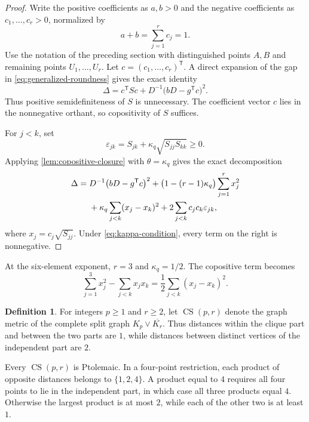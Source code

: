 \documentclass[11pt]{amsart}
\theoremstyle{definition}
\newtheorem{definition}[definition]{Definition}
\theoremstyle{remark}
\newcommand{\CS}{\operatorname{CS}}
\begin{document}
\begin{proof}
Write the positive coefficients as $a,b>0$ and the negative coefficients as $c_1,\ldots,c_r>0$, normalized by
\[
 a+b=\sum_{j=1}^r c_j=1.
\]
Use the notation of the preceding section with distinguished points $A,B$
and remaining points $U_1,\ldots,U_r$. Let $c=(c_1,\ldots,c_r)^{\mathsf T}$. A direct expansion of the gap in \eqref{eq:generalized-roundness} gives the exact identity
\begin{equation}\label{eq:gap-decomposition}
 \Delta
 =c^{\mathsf T}Sc
 +D^{-1}\bigl(bD-g^{\mathsf T}c\bigr)^2.
\end{equation}
Thus positive semidefiniteness of $S$ is unnecessary. The coefficient vector $c$ lies in the nonnegative orthant, so copositivity of $S$ suffices.

For $j<k$, set
\[
 \varepsilon_{jk}
 =S_{jk}+\kappa_q\sqrt{S_{jj}S_{kk}}\ge0.
\]
Applying \cref{lem:copositive-closure} with $\theta=\kappa_q$ gives the exact decomposition
\begin{align}
 \Delta={}&
 D^{-1}\bigl(bD-g^{\mathsf T}c\bigr)^2
 +\bigl(1-(r-1)\kappa_q\bigr)\sum_{j=1}^r x_j^2\notag\\
 &+\kappa_q\sum_{j<k}(x_j-x_k)^2
 +2\sum_{j<k}c_jc_k\varepsilon_{jk},
 \label{eq:two-anchor-stability}
\end{align}
where $x_j=c_j\sqrt{S_{jj}}$. Under \eqref{eq:kappa-condition}, every term on the right is nonnegative.
\end{proof}

At the six-element exponent, $r=3$ and $\kappa_q=1/2$. The copositive term becomes
\begin{equation}\label{eq:three-variable-copositive}
 \sum_{j=1}^3x_j^2-\sum_{j<k}x_jx_k
 =\frac12\sum_{j<k}(x_j-x_k)^2.
\end{equation}

\begin{definition}
For integers $p\ge1$ and $r\ge2$, let $\CS(p,r)$ denote the graph metric
of the complete split graph $K_p\vee\overline{K_r}$. Thus distances
within the clique part and between the two parts are $1$, while distances
between distinct vertices of the independent part are $2$.
\end{definition}

Every $\CS(p,r)$ is Ptolemaic. In a four-point restriction, each product
of opposite distances belongs to $\{1,2,4\}$. A product equal to $4$
requires all four points to lie in the independent part, in which case
all three products equal $4$. Otherwise the largest product is at most
$2$, while each of the other two is at least $1$.
\end{document}
